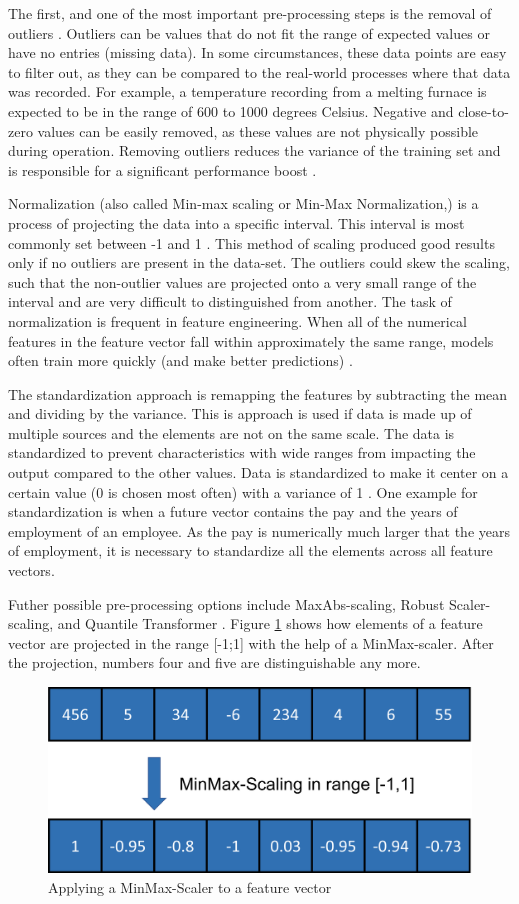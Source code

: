 The first, and one of the most important pre-processing steps is the removal of outliers \cite{Yang}. Outliers can be values that do not fit the range of expected values or have no entries (missing data). In some circumstances, these data points are easy to filter out, as they can be compared to the real-world processes where that data was recorded. For example, a temperature recording from a melting furnace is expected to be in the range of 600 to 1000 degrees Celsius. Negative and close-to-zero values can be easily removed, as these values are not physically possible during operation. Removing outliers reduces the variance of the training set and is responsible for a significant performance boost \cite{Li}.

Normalization (also called Min-max scaling or Min-Max Normalization,) is a process of projecting the data into a specific interval. This interval is most commonly set between -1 and 1 \cite{Peshawa}. This method of scaling produced good results only if no outliers are present in the data-set. The outliers could skew the scaling, such that the non-outlier values are projected onto a very small range of the interval and are very difficult to distinguished from another. The task of normalization is frequent in feature engineering. When all of the numerical features in the feature vector fall within approximately the same range, models often train more quickly (and make better predictions) \cite{Jayalakshmi}.

The standardization approach is remapping the features by subtracting the mean and dividing by the variance. This is approach is used if data is made up of multiple sources and the elements are not on the same scale. The data is standardized to prevent characteristics with wide ranges from impacting the output compared to the other values. Data is standardized to make it center on a certain value (0 is chosen most often) with a variance of 1 \cite{Raju}.
One example for standardization is when a future vector contains the pay and the years of employment of an employee. As the pay is numerically much larger that the years of employment, it is necessary to standardize all the elements across all feature vectors. 

Futher possible pre-processing options include MaxAbs-scaling, Robust Scaler-scaling, and Quantile Transformer \cite{Ahsan}.
Figure \ref{fig:MM} shows how elements of a feature vector are projected in the range [-1;1] with the help of a MinMax-scaler. After the projection, numbers four and five are distinguishable any more. 
\begin{figure}[H]
	\centering
	\includegraphics[width=0.5\linewidth]{IMGs/MM.png}
	\caption{Applying a MinMax-Scaler to a feature vector}
	\label{fig:MM}
\end{figure}


